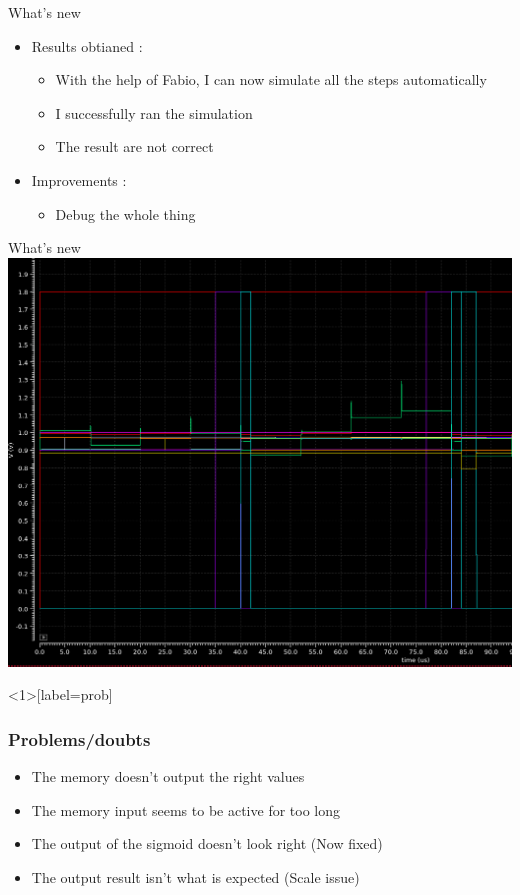 \documentclass[table]{beamer}
\begin{document}
\begin{frame}{What's new}
  \begin{itemize}
    \item Results obtianed :
      \begin{itemize}
          \color{text}
        \item With the help of Fabio, I can now simulate all the steps automatically
        \item I successfully ran the simulation
        \item The result are not correct
      \end{itemize}
    \item Improvements :
      \begin{itemize}
          \color{text}
        \item Debug the whole thing
      \end{itemize}
  \end{itemize}
\end{frame}

\begin{frame}{What's new}
  \includegraphics[width=\textwidth]{fulltrial1/fulltrial1-all-curves}
\end{frame}

\begin{frame}<1>[label=prob]
  \frametitle{Problems/doubts}
  \begin{itemize}
    \item<1-> The memory doesn't output the right values
    \item<2-> The memory input seems to be active for too long
    \item<3-> The output of the sigmoid doesn't look right (Now fixed)
    \item<4-> The output result isn't what is expected (Scale issue)
  \end{itemize}
\end{frame}
\end{document}
